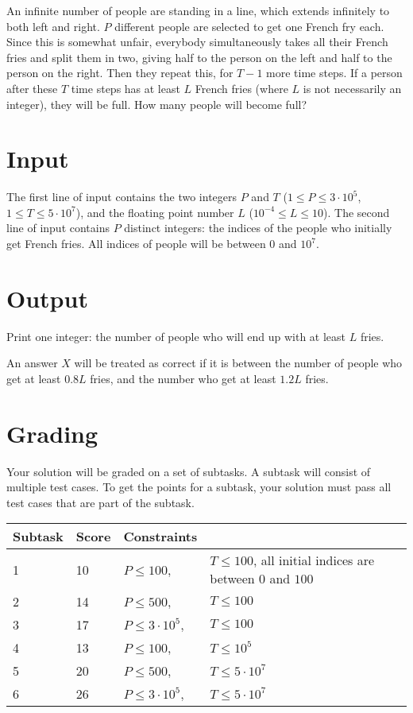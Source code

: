 \def\version{1}

An infinite number of people are standing in a line, which extends infinitely to both left and right.
$P$ different people are selected to get one French fry each.
Since this is somewhat unfair, everybody simultaneously takes all their French fries and split them in two, giving half to the person on the left and half to the person on the right.
Then they repeat this, for $T-1$ more time steps.
If a person after these $T$ time steps has at least $L$ French fries (where $L$ is not necessarily an integer), they will be full.
How many people will become full?

\section*{Input}
The first line of input contains the two integers $P$ and $T$ ($1 \le P \le 3\cdot10^5$, $1 \le T \le 5\cdot10^7$),
and the floating point number $L$ ($10^{-4} \le L \le 10$).
The second line of input contains $P$ distinct integers: the indices of the people who initially get French fries.
All indices of people will be between $0$ and $10^7$.

\section*{Output}
Print one integer: the number of people who will end up with at least $L$ fries.

An answer $X$ will be treated as correct if it is between the number of people who get at least $0.8L$ fries, and
the number who get at least $1.2L$ fries.

\section*{Grading}
Your solution will be graded on a set of subtasks. A subtask will consist of
multiple test cases. To get the points for a subtask, your solution must pass
all test cases that are part of the subtask.

\noindent
\begin{tabular}{| l | l | l l |}
\hline
Subtask & Score & Constraints \\ \hline
  1 & 10 & $P \le 100$, &$T \leq 100$, all initial indices are between $0$ and $100$ \\ \hline
  2 & 14 & $P \le 500$, &$T \leq 100$ \\ \hline
  3 & 17 & $P \le 3\cdot10^5$, &$T \leq 100$ \\ \hline
  4 & 13 & $P \le 100$, &$T \leq 10^5$ \\ \hline
  5 & 20 & $P \le 500$, &$T \leq 5\cdot10^7$ \\ \hline
  6 & 26 & $P \le 3\cdot10^5$, &$T \leq 5\cdot10^7$ \\ \hline
\end{tabular}

